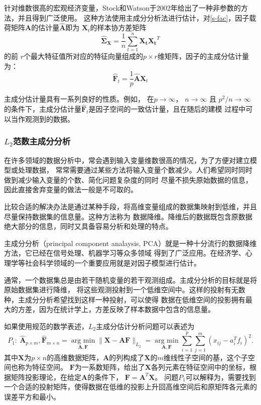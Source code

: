 针对维数很高的宏观经济变量，Stock和Watson于2002年给出了一种非参数的方法，并且得到广泛使用。
这种方法使用主成分分析法进行估计，对\eqref{s-fac}，因子载荷矩阵$\bm{A}$的估计量$\hat{\bm{A}}$即为
$\bm{X}_t$的样本协方差矩阵
\begin{equation}
\hat{\bm{\Sigma}}_{\bm{X}} = \frac1{n}\sum_{t=1}^n\bm{X_t}\bm{X_t}^T
\end{equation}
的前
$r$个最大特征值所对应的特征向量组成的$p\times r$维矩阵，因子的主成分估计量为：
\begin{equation}
\hat{\bm{F}}_t = \frac1{p}\hat{\bm{A}}\bm{X}_t 
\end{equation}

主成分估计量具有一系列良好的性质。例如， 在$p \rightarrow \infty$， $n \rightarrow \infty$ 且 $p^2 / n \rightarrow \infty$
的条件下，主成分估计量$\hat{\bm{F}}_t$是因子空间的一致估计量，且在随后的建模 过程中可以当作观测到的数据。

\subsubsection{$L_2$范数主成分分析}
在许多领域的数据分析中，常会遇到输入变量维数很高的情况，为了方便对建立模型或处理数据，
常常需要通过某些方法将输入变量个数减少。人们希望同时同时做到减少输入变量的个数、简化问题复杂度的同时
尽量不损失原始数据的信息，因此直接舍弃变量的做法一般是不可取的。

比较合适的解决办法是通过某种手段，将高维变量组成的数据集映射到低维，并且尽量保持数据集的信息量。这种方法称为
数据降维。降维后的数据既包含原数据绝大部分的信息，同时又具备容易分析和处理的特点。

主成分分析（principal component analaysis, PCA）就是一种十分流行的数据降维方法，它已经在信号处理、机器学习等众多领域
得到了广泛应用。在经济学、心理学等社会科学领域的一个重要应用就是对因子模型进行估计。

通常，一个数据集总是由若干随机变量的若干观测组成。主成分分析的目标就是将原始数据集进行降维，
将这些观测投射到一个低维空间中。这样的投射有无数种，主成分分析希望找到这样一种投射，可以使得
数据在低维空间的投影拥有最大的方差，因为在统计学上，方差反映了样本数据中包含的信息量。

如果使用规范的数学表述，$L_2$主成分估计分析问题可以表述为
\begin{equation}\label{pca-l2-p1}
P_1: \ \hat{\bm{A}}_{p\times m}, \hat{\bm{F}}_{m\times n} = \underset{\bm{A},\bm{F}}{\operatorname{arg\ min} } 
\|\bm{X} - \bm{A}\bm{F}\|_{L_2}
 = \underset{\bm{A}, \bm{F}}{\operatorname{arg\ min}} \sum_{i=1}^p \sum_{j=1}^m (x_{ij} - a_i^Tf_i)^2 .
\end{equation}
其中$\bm{X}$为$p \times n$的高维数据矩阵，$\bm{A}$的列构成了$\bm{X}$的$m$维线性子空间的基，这个子空间也称为特征空间。
$\bm{F}$为一系数矩阵，给出了$\bm{X}$各列元素在特征空间中的坐标，根据矩阵投影理论，在给定$\bm{A}$的条件下，
$\bm{F} = \bm{A}^T \bm{X}$。
问题$P_1$可以解释为，需要找到一个合适的投射矩阵，使得数据在低维的投影上升回高维空间后和原矩阵各元素的误差平方和最小。


